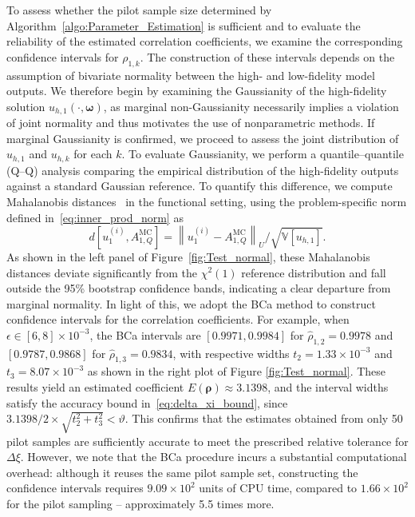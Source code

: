 To assess whether the pilot sample size determined by Algorithm~\ref{algo:Parameter_Estimation} is sufficient and to evaluate the reliability of the estimated correlation coefficients, we examine the corresponding confidence intervals for $\rho_{1,k}$. The construction of these intervals depends on the assumption of bivariate normality between the high- and low-fidelity model outputs. We therefore begin by examining the Gaussianity of the high-fidelity solution $u_{h,1}(\cdot, \boldsymbol{\omega})$, as marginal non-Gaussianity necessarily implies a violation of joint normality and thus motivates the use of nonparametric methods. If marginal Gaussianity is confirmed, we proceed to assess the joint distribution of $u_{h,1}$ and $u_{h,k}$ for each $k$. To evaluate Gaussianity, we perform a quantile–quantile (Q–Q) analysis comparing the empirical distribution of the high-fidelity outputs against a standard Gaussian reference. To quantify this difference, we compute Mahalanobis distances~\cite{Ma:2018} in the functional setting, using the problem-specific norm defined in~\eqref{eq:inner_prod_norm} as
%
\[
d\left[u_{1}^{(i)}, A_{1,Q}^{\text{MC}}\right] = \left\|u_{1}^{(i)} - A_{1,Q}^{\text{MC}}\right\|_U / \sqrt{\mathbb{V}[u_{h,1}]}.
\]
%
As shown in the left panel of Figure~\ref{fig:Test_normal}, these Mahalanobis distances deviate significantly from the $\chi^2(1)$ reference distribution and fall outside the 95\% bootstrap confidence bands, indicating a clear departure from marginal normality. In light of this, we adopt the BCa method to construct confidence intervals for the correlation coefficients. For example, when $\epsilon \in [6, 8] \times 10^{-3}$, the BCa intervals are $[0.9971, 0.9984]$ for $\widehat \rho_{1,2} = 0.9978$ and $[0.9787, 0.9868]$ for $\widehat \rho_{1,3} = 0.9834$, with respective widths $t_2 = 1.33 \times 10^{-3}$ and $t_3 = 8.07 \times 10^{-3}$ 
as shown in the right plot of Figure \ref{fig:Test_normal}.  These results yield an estimated coefficient $E(\boldsymbol{\rho}) \approx 3.1398$, and the interval widths satisfy the accuracy bound in~\eqref{eq:delta_xi_bound}, since $3.1398/2\times \sqrt{t_2^2+t_3^2}<\vartheta$. This confirms that the estimates obtained from only 50 pilot samples are sufficiently accurate to meet the prescribed relative tolerance for $\Delta\xi$. However, we note that the BCa procedure incurs a substantial computational overhead: although it reuses the same pilot sample set, constructing the confidence intervals requires $9.09 \times 10^2$ units of CPU time, compared to $1.66 \times 10^2$ for the pilot sampling -- approximately 5.5 times more.



